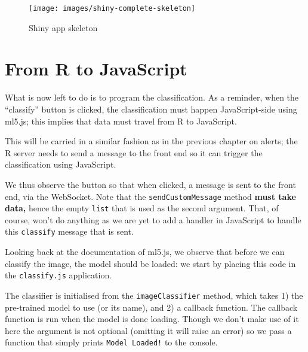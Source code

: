 \documentclass[10pt,]{krantz}
\makeatletter
\newenvironment{Shaded}{\begin{snugshade}}{\end{snugshade}}
\newcommand{\KeywordTok}[1]{\textcolor[rgb]{0.27,0.27,0.27}{\textbf{#1}}}
\newcommand{\NormalTok}[1]{#1}
\newcommand{\OperatorTok}[1]{\textcolor[rgb]{0.43,0.43,0.43}{\textbf{#1}}}
\newcommand{\StringTok}[1]{\textcolor[rgb]{0.5,0.5,0.5}{#1}}
\newenvironment{kframe}{%
\medskip{}
\setlength{\fboxsep}{.8em}
 \def\at@end@of@kframe{}%
 \ifinner\ifhmode%
  \def\at@end@of@kframe{\end{minipage}}%
  \begin{minipage}{\columnwidth}%
 \fi\fi%
 \def\FrameCommand##1{\hskip\@totalleftmargin \hskip-\fboxsep
 \colorbox{shadecolor}{##1}\hskip-\fboxsep
     \hskip-\linewidth \hskip-\@totalleftmargin \hskip\columnwidth}%
 \MakeFramed {\advance\hsize-\width
   \@totalleftmargin\z@ \linewidth\hsize
   \@setminipage}}%
 {\par\unskip\endMakeFramed%
 \at@end@of@kframe}
\renewenvironment{Shaded}{\begin{kframe}}{\end{kframe}}
\makeatother
\begin{document}
\begin{figure}[H]

{\centering \texttt{[image: images/shiny-complete-skeleton]} 

}

\caption{Shiny app skeleton}\label{fig:shiny-complete-skeleton}
\end{figure}

\hypertarget{shiny-complete-r2js}{%
\section{From R to JavaScript}\label{shiny-complete-r2js}}

What is now left to do is to program the classification. As a reminder, when the ``classify'' button is clicked, the classification must happen JavaScript-side using ml5.js; this implies that data must travel from R to JavaScript.

This will be carried in a similar fashion as in the previous chapter on alerts; the R server needs to send a message to the front end so it can trigger the classification using JavaScript.

\begin{Shaded}
\end{Shaded}

We thus observe the button so that when clicked, a message is sent to the front end, via the WebSocket. Note that the \texttt{sendCustomMessage} method \textbf{must take data,} hence the empty \texttt{list} that is used as the second argument. That, of course, won't do anything as we are yet to add a handler in JavaScript to handle this \texttt{classify} message that is sent.

Looking back at the documentation of ml5.js, we observe that before we can classify the image, the model should be loaded: we start by placing this code in the \texttt{classify.js} application.

The classifier is initialised from the \texttt{imageClassifier} method, which takes 1) the pre-trained model to use (or its name), and 2) a callback function. The callback function is run when the model is done loading. Though we don't make use of it here the argument is not optional (omitting it will raise an error) so we pass a function that simply prints \texttt{Model\ Loaded!} to the console.
\end{document}
